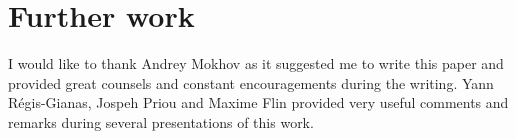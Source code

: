 \documentclass[format=sigplan]{acmart}
\begin{document}
\section{Further work}
\label{sec:related}


\begin{acks}
I would like to thank Andrey Mokhov as it suggested me to write this paper and provided great counsels and constant encouragements during the writing. Yann Régis-Gianas, Jospeh Priou and Maxime Flin provided very useful comments and remarks during several presentations of this work.
\end{acks}




\end{document}
